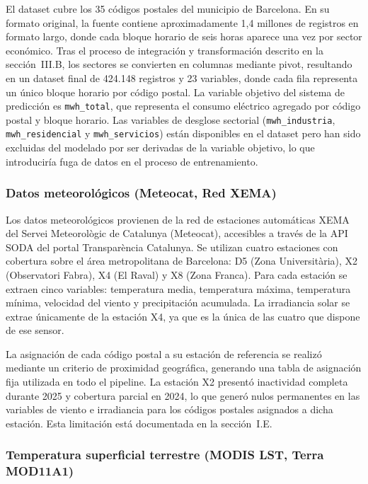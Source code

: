 \documentclass[12pt, a4paper]{article}
\begin{document}
El dataset cubre los 35 códigos postales del municipio de Barcelona. En su formato original, la fuente contiene aproximadamente 1,4 millones de registros en formato largo, donde cada bloque horario de seis horas aparece una vez por sector económico. Tras el proceso de integración y transformación descrito en la sección~III.B, los sectores se convierten en columnas mediante pivot, resultando en un dataset final de 424.148 registros y 23 variables, donde cada fila representa un único bloque horario por código postal. La variable objetivo del sistema de predicción es \texttt{mwh\_total}, que representa el consumo eléctrico agregado por código postal y bloque horario. Las variables de desglose sectorial (\texttt{mwh\_industria}, \texttt{mwh\_residencial} y \texttt{mwh\_servicios}) están disponibles en el dataset pero han sido excluidas del modelado por ser derivadas de la variable objetivo, lo que introduciría fuga de datos en el proceso de entrenamiento.

\subsubsection{Datos meteorológicos (Meteocat, Red XEMA)}

Los datos meteorológicos provienen de la red de estaciones automáticas XEMA del Servei Meteorològic de Catalunya (Meteocat), accesibles a través de la API SODA del portal Transparència Catalunya. Se utilizan cuatro estaciones con cobertura sobre el área metropolitana de Barcelona: D5 (Zona Universitària), X2 (Observatori Fabra), X4 (El Raval) y X8 (Zona Franca). Para cada estación se extraen cinco variables: temperatura media, temperatura máxima, temperatura mínima, velocidad del viento y precipitación acumulada. La irradiancia solar se extrae únicamente de la estación X4, ya que es la única de las cuatro que dispone de ese sensor.

La asignación de cada código postal a su estación de referencia se realizó mediante un criterio de proximidad geográfica, generando una tabla de asignación fija utilizada en todo el pipeline. La estación X2 presentó inactividad completa durante 2025 y cobertura parcial en 2024, lo que generó nulos permanentes en las variables de viento e irradiancia para los códigos postales asignados a dicha estación. Esta limitación está documentada en la sección~I.E.

\subsubsection{Temperatura superficial terrestre (MODIS LST, Terra MOD11A1)}
\end{document}
